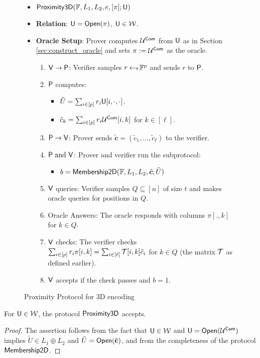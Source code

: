 \begin{figure}[h!]
\begin{framed}
\begin{itemize}
\item {$\mathsf{Proximity3D}(\mathbb{F},L_1,L_2,e,[\pi];\mathsf{U})$}
\item {\bf Relation}: $\mathsf{U}=\mathsf{Open}(\pi)$, $\mathsf{U}\in \mathcal{W}$.
\item {\bf Oracle Setup}: Prover computes $\mathcal{U}^{\mathsf{Com}}$ from $\mathsf{U}$ as in
Section \ref{sec:construct_oracle} and sets
$\pi := \mathcal{U}^{\mathsf{Com}}$ as the oracle.
\begin{enumerate}[{1.}]
\item $\mathsf{V}\rightarrow \mathsf{P}$: Verifier samples $r\hskip2.3pt{\gets\!\!\mbox{\tiny${\$}$\normalsize}}\, \mathbb{F}^p$ and
sends $r$ to $\mathsf{P}$.
\item $\mathsf{P}$ computes: 
	\begin{itemize}
	\item $\tilde{U}=\sum_{i\in [p]}r_i\mathsf{U}[i,\cdot,\cdot]$.
	\item $\tilde{c}_k = \sum_{i\in [p]}r_i\mathcal{U}^{\mathsf{Com}}[i,k]$ for $k\in [\ell]$.
	\end{itemize}
\item $\mathsf{P}\rightarrow \mathsf{V}$: Prover sends
$\tilde{\bm{c}}=(\tilde{c}_1,\ldots,\tilde{c}_\ell)$ to the verifier.
\item $\mathsf{P} \text{ and } \mathsf{V}$: Prover and verifier run the subprotocol:
	\begin{itemize}
	\item $b=\mathsf{Membership2D}(\mathbb{F},L_1,L_2,\tilde{\bm{c}};\tilde{U})$
	\end{itemize}
\item $\mathsf{V}$ queries: Verifier samples $Q\subseteq [n]$ of size
$t$ and makes oracle queries for positions in $Q$.
\item Oracle Answers: The oracle responds with columns $\pi[.,k]$ for
$k\in Q$.
\item $\mathsf{V}$ checks: The verifier checks $\sum_{i\in
[p]}r_i\pi[i,k]=\sum_{i\in [\ell]}\mathcal{T}[i,k]\tilde{c}_i$ for $k\in Q$ (the matrix $\mathcal{T}$ as defined earlier).
\item $\mathsf{V}$ accepts if the check passes and $b=1$.
\end{enumerate}
\end{itemize}
\end{framed}
\caption{Proximity Protocol for 3D encoding}
\label{fig:prox3d}
\end{figure}

\begin{lemma}[Completeness]\label{lem:proximity3d_complete}
For $\mathsf{U}\in\mathcal{W}$, the protocol $\mathsf{Proximity3D}$ accepts.
\end{lemma}
\begin{proof}
The assertion follows from the fact that $\mathsf{U}\in \mathcal{W}$ and
$\mathsf{U}=\mathsf{Open}(\mathcal{U}^{\mathsf{Com}})$ implies $\tilde{U}\in L_1\oplus L_2$ and
$\tilde{U}=\mathsf{Open}(\tilde{\mathbf{c}})$, and from the completeness of the protocol
$\mathsf{Membership2D}$.
\end{proof}

